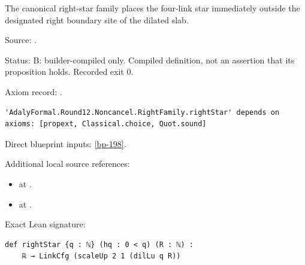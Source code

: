 \begin{definition}[bp-214]
\label{bp-214}
\leanok
The canonical right-star family places the four-link star immediately outside the designated right boundary site of the dilated slab.

\par Source: \texttt{}.
\par Status: B: builder-compiled only. Compiled definition, not an assertion that its proposition holds. Recorded exit 0.
\par Axiom record: \texttt{}.
\begin{verbatim}
'AdalyFormal.Round12.Noncancel.RightFamily.rightStar' depends on axioms: [propext, Classical.choice, Quot.sound]
\end{verbatim}
\par Direct blueprint inputs: \ref{bp-198}.
\par Additional local source references:
\begin{itemize}
\item \texttt{} at \texttt{}.
\item \texttt{} at \texttt{}.
\end{itemize}
\par Exact Lean signature:
\begin{verbatim}
def rightStar {q : ℕ} (hq : 0 < q) (R : ℕ) :
    ℝ → LinkCfg (scaleUp 2 1 (dilLu q R))
\end{verbatim}
\end{definition}

